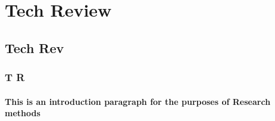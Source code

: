 \section{Tech Review}
\subsection{Tech Rev}
\subsubsection{T R}
\paragraph{This is an introduction paragraph for the purposes of Research methods}